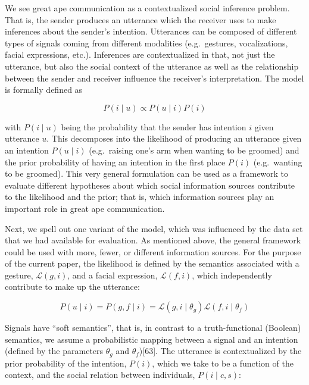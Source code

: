 \documentclass[
  english,
  man,floatsintext]{apa6}
\begin{document}
We see great ape communication as a contextualized social inference problem. That is, the sender produces an utterance which the receiver uses to make inferences about the sender's intention. Utterances can be composed of different types of signals coming from different modalities (e.g.~gestures, vocalizations, facial expressions, etc.). Inferences are contextualized in that, not just the utterance, but also the social context of the utterance as well as the relationship between the sender and receiver influence the receiver's interpretation. The model is formally defined as

\begin{equation}
P(i \mid u)\propto P(u \mid i) P(i)
\end{equation}

with \(P(i \mid u)\) being the probability that the sender has intention \(i\) given utterance \(u\). This decomposes into the likelihood of producing an utterance given an intention \(P(u \mid i)\) (e.g.~raising one's arm when wanting to be groomed) and the prior probability of having an intention in the first place \(P(i)\) (e.g.~wanting to be groomed). This very general formulation can be used as a framework to evaluate different hypotheses about which social information sources contribute to the likelihood and the prior; that is, which information sources play an important role in great ape communication.

Next, we spell out one variant of the model, which was influenced by the data set that we had available for evaluation. As mentioned above, the general framework could be used with more, fewer, or different information sources. For the purpose of the current paper, the likelihood is defined by the semantics associated with a gesture, \(\mathcal{L}(g,i)\), and a facial expression, \(\mathcal{L}(f,i)\), which independently contribute to make up the utterance:

\begin{equation}
P(u \mid i) = P(g,f \mid i) = \mathcal{L}(g,i \mid \theta_{g}) \mathcal{L}(f,i \mid \theta_{f})
\end{equation}

Signals have ``soft semantics'', that is, in contrast to a truth-functional (Boolean) semantics, we assume a probabilistic mapping between a signal and an intention (defined by the parameters \(\theta_{g}\) and \(\theta_{f}\)){[}63{]}. The utterance is contextualized by the prior probability of the intention, \(P(i)\), which we take to be a function of the context, and the social relation between individuals, \(P(i \mid c,s)\):
\end{document}

